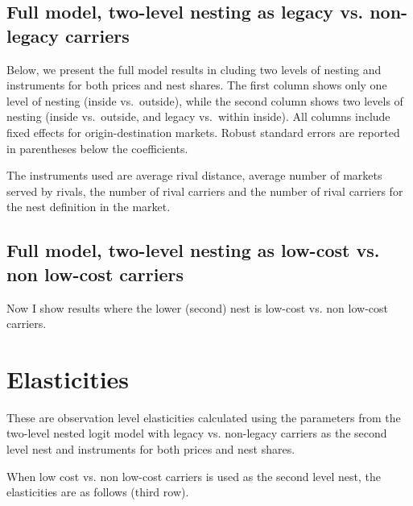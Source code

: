 \documentclass{article}
\begin{document}
 

\pagebreak
\subsection{Full model, two-level nesting as legacy vs. non-legacy carriers}


Below, we present the full model results in cluding two levels of nesting and instruments for both prices and nest shares. The first column shows only one level of nesting (inside vs.\ outside), while the second column shows two levels of nesting (inside vs.\ outside, and legacy vs.\ within inside). All columns include fixed effects for origin-destination markets. Robust standard errors are reported in parentheses below the coefficients.

The instruments used are average rival distance, average number of markets served by rivals, the number of rival carriers and the number of rival carriers for the nest definition in the market. 


\pagebreak
\subsection{Full model, two-level nesting as low-cost vs. non low-cost carriers}
Now I show results where the lower (second) nest is low-cost vs. non low-cost carriers.



\pagebreak
\section{Elasticities}

These are observation level elasticities calculated using the parameters from the two-level nested logit model with legacy vs. non-legacy carriers as the second level nest and instruments for both prices and nest shares.



When low cost vs. non low-cost carriers is used as the second level nest, the elasticities are as follows (third row).

\end{document}
